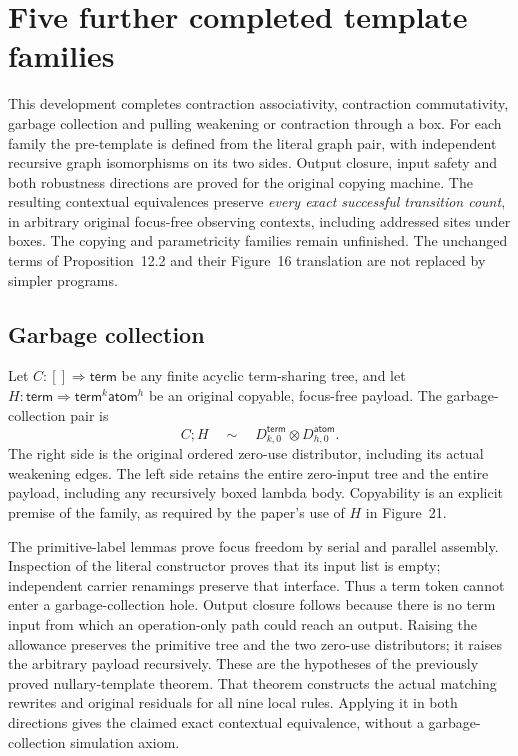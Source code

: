 \clearpage
\section{Five further completed template families}
\label{sec:copying-four-templates}
This development completes contraction associativity, contraction
commutativity, garbage collection and pulling weakening or contraction through a box.
For each family the pre-template is defined from the literal graph pair,
with independent recursive graph isomorphisms on its two sides. Output
closure, input safety and both robustness directions are proved for the
original copying machine. The resulting contextual equivalences preserve
\emph{every exact successful transition count}, in arbitrary original
focus-free observing contexts, including addressed sites under boxes.
The copying and parametricity families remain unfinished.
The unchanged terms of Proposition~12.2 and their Figure~16 translation
are not replaced by simpler programs.

\subsection{Garbage collection}
Let $C:[]\Rightarrow\mathsf{term}$ be any finite acyclic term-sharing tree,
and let $H:\mathsf{term}\Rightarrow\mathsf{term}^{k}\mathsf{atom}^{h}$ be
an original copyable, focus-free payload. The garbage-collection pair is
\[
 C;H\quad\sim\quad D^{\mathsf{term}}_{k,0}\otimes D^{\mathsf{atom}}_{h,0}.
\]
The right side is the original ordered zero-use distributor, including its
actual weakening edges. The left side retains the entire zero-input tree
and the entire payload, including any recursively boxed lambda body.
Copyability is an explicit premise of the family, as required by the
paper's use of $H$ in Figure~21.

The primitive-label lemmas prove focus freedom by serial and parallel
assembly. Inspection of the literal constructor proves that its input list
is empty; independent carrier renamings preserve that interface. Thus a
term token cannot enter a garbage-collection hole. Output closure follows
because there is no term input from which an operation-only path could
reach an output. Raising the allowance preserves the primitive tree and
the two zero-use distributors; it raises the arbitrary payload recursively.
These are the hypotheses of the previously proved nullary-template theorem.
That theorem constructs the actual matching rewrites and original residuals
for all nine local rules. Applying it in both directions gives the claimed
exact contextual equivalence, without a garbage-collection simulation axiom.


